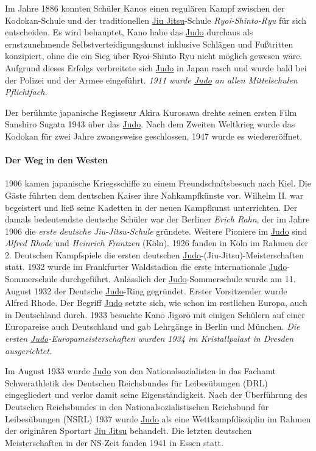 \documentclass[justified, a4paper, notitlepage, captions=tableheading, nobib]{tufte-handout}
\begin{document}
Im Jahre 1886 konnten Schüler Kanos einen regulären Kampf zwischen der Kodokan-Schule und der traditionellen \hyperref[orgd95ae56]{Jiu Jitsu}-Schule \emph{Ryoi-Shinto-Ryu} für sich entscheiden. Es wird behauptet, Kano habe das \hyperref[org39a3ee2]{Judo} durchaus als ernstzunehmende Selbstverteidigungskunst inklusive Schlägen und Fußtritten konzipiert, ohne die ein Sieg über Ryoi-Shinto Ryu nicht möglich gewesen wäre. Aufgrund dieses Erfolgs verbreitete sich \hyperref[org39a3ee2]{Judo} in Japan rasch und wurde bald bei der Polizei und der Armee eingeführt. \emph{1911 wurde \hyperref[org39a3ee2]{Judo} an allen Mittelschulen Pflichtfach.}

Der berühmte japanische Regisseur Akira Kurosawa drehte seinen ersten Film Sanshiro Sugata 1943 über das \hyperref[org39a3ee2]{Judo}.
Nach dem Zweiten Weltkrieg wurde das Kodokan für zwei Jahre zwangsweise geschlossen, 1947 wurde es wiedereröffnet.

\paragraph{Der Weg in den Westen}
\label{sec:org5e037e6}
1906 kamen japanische Kriegsschiffe zu einem Freundschaftsbesuch nach Kiel. Die Gäste führten dem deutschen Kaiser ihre Nahkampfkünste vor. Wilhelm II. war begeistert und ließ seine Kadetten in der neuen Kampfkunst unterrichten. Der damals bedeutendste deutsche Schüler war der Berliner \emph{Erich Rahn}, der im Jahre 1906 die \emph{erste deutsche Jiu-Jitsu-Schule} gründete. Weitere Pioniere im \hyperref[org39a3ee2]{Judo} sind \emph{Alfred Rhode} und \emph{Heinrich Frantzen} (Köln). 1926 fanden in Köln im Rahmen der 2. Deutschen Kampfspiele die ersten deutschen \hyperref[org39a3ee2]{Judo}-(Jiu-Jitsu)-Meisterschaften statt. 1932 wurde im Frankfurter Waldstadion die erste internationale \hyperref[org39a3ee2]{Judo}-Sommerschule durchgeführt. Anlässlich der \hyperref[org39a3ee2]{Judo}-Sommerschule wurde am 11. August 1932 der Deutsche \hyperref[org39a3ee2]{Judo}-Ring gegründet. Erster Vorsitzender wurde Alfred Rhode. Der Begriff \hyperref[org39a3ee2]{Judo} setzte sich, wie schon im restlichen Europa, auch in Deutschland durch. 1933 besuchte Kanō Jigorō mit einigen Schülern auf einer Europareise auch Deutschland und gab Lehrgänge in Berlin und München. \emph{Die ersten \hyperref[org39a3ee2]{Judo}-Europameisterschaften wurden 1934 im Kristallpalast in Dresden ausgerichtet.}

Im August 1933 wurde \hyperref[org39a3ee2]{Judo} von den Nationalsozialisten in das Fachamt Schwerathletik des Deutschen Reichsbundes für Leibesübungen (DRL) eingegliedert und verlor damit seine Eigenständigkeit. Nach der Überführung des Deutschen Reichsbundes in den Nationalsozialistischen Reichsbund für Leibesübungen (NSRL) 1937 wurde \hyperref[org39a3ee2]{Judo} als eine Wettkampfdisziplin im Rahmen der originären Sportart \hyperref[orgd95ae56]{Jiu Jitsu} behandelt. Die letzten deutschen Meisterschaften in der NS-Zeit fanden 1941 in Essen statt.
\end{document}
